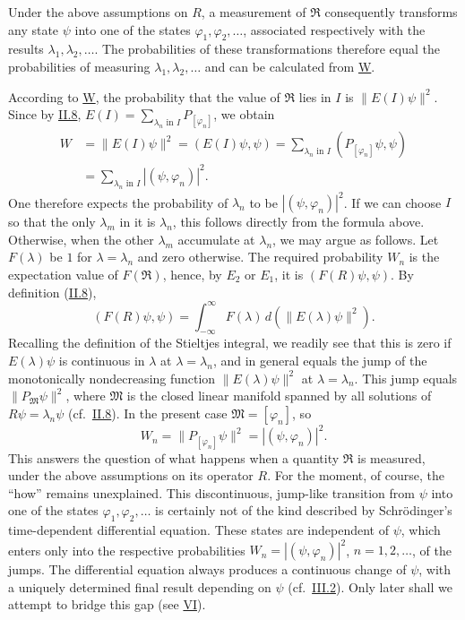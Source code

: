 \documentclass[fontsize=13pt,twoside,openany,headings=normal,parskip=false,bookmarkpackage=false,DIV=calc]{scrbook}
\begin{document}
Under the above assumptions on $R$, a measurement of $\mathfrak R$ consequently transforms any state $\psi$ into one of the states $\varphi_1,\varphi_2,\ldots$, associated respectively with the results $\lambda_1,\lambda_2,\ldots$. The probabilities of these transformations therefore equal the probabilities of measuring $\lambda_1,\lambda_2,\ldots$ and can be calculated from \hyperref[post:III.1.W]{W}.

According to \hyperref[post:III.1.W]{W}, the probability that the value of $\mathfrak R$ lies in $I$ is $\|E(I)\psi\|^2$. Since by \hyperref[sec:II.8]{II.8}, $E(I)=\sum_{\lambda_n\text{ in }I}P_{[\varphi_n]}$, we obtain
\begin{align*}
W&=\|E(I)\psi\|^2=(E(I)\psi,\psi)
=\sum_{\lambda_n\text{ in }I}(P_{[\varphi_n]}\psi,\psi)\\
&=\sum_{\lambda_n\text{ in }I}|(\psi,\varphi_n)|^2.
\end{align*}
One therefore expects the probability of $\lambda_n$ to be $|(\psi,\varphi_n)|^2$. If we can choose $I$ so that the only $\lambda_m$ in it is $\lambda_n$, this follows directly from the formula above. Otherwise, when the other $\lambda_m$ accumulate at $\lambda_n$, we may argue as follows. Let $F(\lambda)$ be $1$ for $\lambda=\lambda_n$ and zero otherwise. The required probability $W_n$ is the expectation value of $F(\mathfrak R)$, hence, by \hyperref[post:III.1.E2]{$E_2$} or \hyperref[post:III.1.E1]{$E_1$}, it is $(F(R)\psi,\psi)$. By definition (\hyperref[sec:II.8]{II.8}),
\[
(F(R)\psi,\psi)=\int_{-\infty}^{\infty}F(\lambda)\,d(\|E(\lambda)\psi\|^2).
\]
Recalling the definition of the Stieltjes integral, we readily see that this is zero if $E(\lambda)\psi$ is continuous
\hypertarget{origpage-114}{}%
in $\lambda$ at $\lambda=\lambda_n$, and in general equals the jump of the monotonically nondecreasing function $\|E(\lambda)\psi\|^2$ at $\lambda=\lambda_n$. This jump equals $\|P_{\mathfrak M}\psi\|^2$, where $\mathfrak M$ is the closed linear manifold spanned by all solutions of $R\psi=\lambda_n\psi$ (cf.\ \hyperref[sec:II.8]{II.8}). In the present case $\mathfrak M=[\varphi_n]$, so
\[
W_n=\|P_{[\varphi_n]}\psi\|^2=|(\psi,\varphi_n)|^2.
\]
This answers the question of what happens when a quantity $\mathfrak R$ is measured, under the above assumptions on its operator $R$. For the moment, of course, the ``how'' remains unexplained. This discontinuous, jump-like transition from $\psi$ into one of the states $\varphi_1,\varphi_2,\ldots$ is certainly not of the kind described by Schrödinger's time-dependent differential equation. These states are independent of $\psi$, which enters only into the respective probabilities $W_n=|(\psi,\varphi_n)|^2$, $n=1,2,\ldots$, of the jumps. The differential equation always produces a continuous change of $\psi$, with a uniquely determined final result depending on $\psi$ (cf.\ \hyperref[sec:III.2]{III.2}). Only later shall we attempt to bridge this gap (see \hyperref[chap:VI]{VI}).
\end{document}
